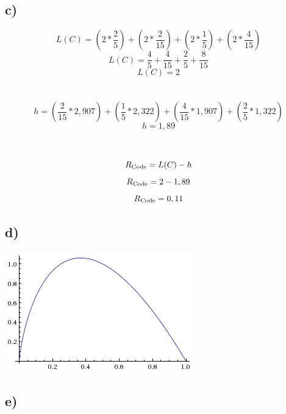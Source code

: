 \documentclass[a4paper,12pt]{scrartcl}
\begin{document}
\subsection{c)}
\begin{displaymath}
L(C) = (2*\frac{2} {5})+(2*\frac{2} {15})+(2*\frac{1} {5})+(2*\frac{4} {15})
\end{displaymath}
\begin{displaymath}
L(C) = \frac{4} {5} + \frac{4} {15} + \frac{2} {5} + \frac{8} {15}
\end{displaymath}
\begin{displaymath}
L(C) = 2
\end{displaymath}
\\\\
\begin{displaymath}
h = (\frac{2} {15}*2,907)+(\frac{1} {5}*2,322)+(\frac{4} {15}*1,907)+(\frac{2} {5}*1,322)
\end{displaymath}
\begin{displaymath}
h = 1,89
\end{displaymath}
\\\\
\begin{displaymath}
R\textsubscript{Code} = L(C) - h
\end{displaymath}
\begin{displaymath}
R\textsubscript{Code} = 2 - 1,89
\end{displaymath}
\begin{displaymath}
R\textsubscript{Code} = 0,11
\end{displaymath}

\subsection{d)}
\includegraphics{./images/Aufgabe6d}

\subsection{e)}
\end{document}
